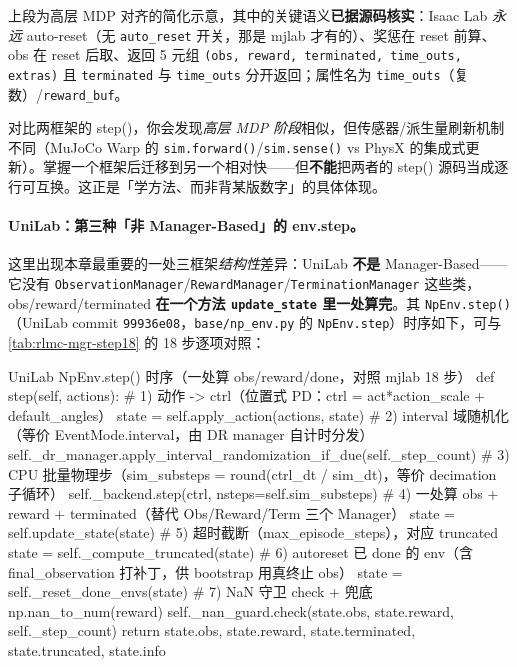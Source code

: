 上段为高层 MDP 对齐的简化示意，其中的关键语义\textbf{已据源码核实}：Isaac Lab \emph{永远} auto-reset（无 \texttt{auto\_reset} 开关，那是 mjlab 才有的）、奖惩在 reset 前算、obs 在 reset 后取、返回 5 元组 \texttt{(obs, reward, terminated, time\_outs, extras)} 且 \texttt{terminated} 与 \texttt{time\_outs} 分开返回；属性名为 \texttt{time\_outs}（复数）/\texttt{reward\_buf}。

\begin{insight}\label{ins:rlmc-mgr-align}
对比两框架的 step()，你会发现\emph{高层 MDP 阶段}相似，但传感器/派生量刷新机制不同（MuJoCo Warp 的 \verb|sim.forward()|/\verb|sim.sense()| vs PhysX 的集成式更新）。掌握一个框架后迁移到另一个相对快——但\textbf{不能}把两者的 step() 源码当成逐行可互换。这正是「学方法、而非背某版数字」的具体体现。
\end{insight}

\paragraph{UniLab：第三种「非 Manager-Based」的 env.step。}这里出现本章最重要的一处三框架\emph{结构性}差异：UniLab \textbf{不是} Manager-Based——它没有 \verb|ObservationManager|/\verb|RewardManager|/\verb|TerminationManager| 这些类，obs/reward/terminated \textbf{在一个方法 \texttt{update\_state} 里一处算完}。其 \verb|NpEnv.step()|（UniLab commit \texttt{99936e08}，\texttt{base/np\_env.py} 的 \verb|NpEnv.step|）时序如下，可与 \cref{tab:rlmc-mgr-step18} 的 18 步逐项对照：

\begin{codebox}[Python]{UniLab NpEnv.step() 时序（一处算 obs/reward/done，对照 mjlab 18 步）}
def step(self, actions):
    # 1) 动作 -> ctrl（位置式 PD：ctrl = act*action_scale + default_angles）
    state = self.apply_action(actions, state)
    # 2) interval 域随机化（等价 EventMode.interval，由 DR manager 自计时分发）
    self._dr_manager.apply_interval_randomization_if_due(self._step_count)
    # 3) CPU 批量物理步（sim_substeps = round(ctrl_dt / sim_dt)，等价 decimation 子循环）
    self._backend.step(ctrl, nsteps=self.sim_substeps)
    # 4) 一处算 obs + reward + terminated（替代 Obs/Reward/Term 三个 Manager）
    state = self.update_state(state)
    # 5) 超时截断（max_episode_steps），对应 truncated
    state = self._compute_truncated(state)
    # 6) autoreset 已 done 的 env（含 final_observation 打补丁，供 bootstrap 用真终止 obs）
    state = self._reset_done_envs(state)
    # 7) NaN 守卫 check + 兜底 np.nan_to_num(reward)
    self._nan_guard.check(state.obs, state.reward, self._step_count)
    return state.obs, state.reward, state.terminated, state.truncated, state.info
\end{codebox}

